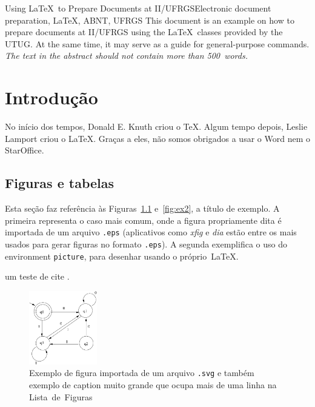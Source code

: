 \documentclass[dipl,ecp,openright]{iiufrgs}
\begin{document}
\begin{englishabstract}{Using \LaTeX\ to Prepare Documents at II/UFRGS}{Electronic document preparation, \LaTeX, ABNT, UFRGS}
This document is an example on how to prepare documents at II/UFRGS
using the \LaTeX\ classes provided by the UTUG\@. At the same time, it
may serve as a guide for general-purpose commands. \emph{The text in
the abstract should not contain more than 500~words.}
\end{englishabstract}


\chapter{Introdução}

No início dos tempos, Donald E. Knuth criou o \TeX. Algum tempo depois, Leslie Lamport criou o \LaTeX. Graças a eles, não somos obrigados a usar o Word nem o StarOffice.

\section{Figuras e tabelas}

Esta seção faz referência às Figuras~\ref{fig:ex1} e~\ref{fig:ex2}, a título de exemplo. A primeira representa o caso mais comum, onde a figura propriamente dita é importada de um arquivo \texttt{.eps} (aplicativos como \emph{xfig} e \emph{dia} estão entre os mais usados para gerar figuras no formato \texttt{.eps}). A segunda exemplifica o uso do environment \texttt{picture}, para desenhar usando o próprio~\LaTeX.


um teste de cite \citep{kastenholz} .

\begin{figure}
        \centerline{
            \includegraphics[width=8em]{fig.pdf}
        }
        \caption{Exemplo de figura importada de um arquivo \texttt{.svg} e também exemplo de caption muito grande que ocupa mais de uma linha na Lista~de~Figuras}
        \label{fig:ex1}
\end{figure}
\end{document}
